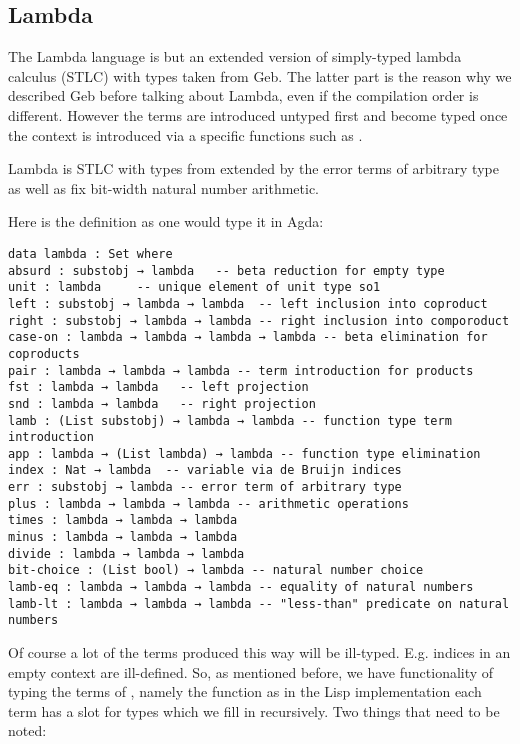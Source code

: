 \subsection{Lambda}

The Lambda language is but an extended version of simply-typed lambda calculus (STLC) with types taken from Geb. The latter part is the reason why we described Geb before talking about Lambda, even if the compilation order is different. However the terms are introduced untyped first and become typed once the context is introduced via a specific functions such as .
\begin{definition}
    Lambda is STLC with types from \gebobj extended by the error terms \lamerr of arbitrary type as well as fix bit-width natural number arithmetic.
\end{definition}

Here is the definition as one would type it in Agda:

\begin{verbatim}
data lambda : Set where
absurd : substobj → lambda   -- beta reduction for empty type
unit : lambda     -- unique element of unit type so1
left : substobj → lambda → lambda  -- left inclusion into coproduct
right : substobj → lambda → lambda -- right inclusion into comporoduct
case-on : lambda → lambda → lambda → lambda -- beta elimination for coproducts
pair : lambda → lambda → lambda -- term introduction for products
fst : lambda → lambda   -- left projection
snd : lambda → lambda   -- right projection
lamb : (List substobj) → lambda → lambda -- function type term introduction
app : lambda → (List lambda) → lambda -- function type elimination 
index : Nat → lambda  -- variable via de Bruijn indices
err : substobj → lambda -- error term of arbitrary type
plus : lambda → lambda → lambda -- arithmetic operations
times : lambda → lambda → lambda
minus : lambda → lambda → lambda
divide : lambda → lambda → lambda
bit-choice : (List bool) → lambda -- natural number choice
lamb-eq : lambda → lambda → lambda -- equality of natural numbers
lamb-lt : lambda → lambda → lambda -- "less-than" predicate on natural numbers
\end{verbatim}

Of course a lot of the terms produced this way will be ill-typed. E.g. indices in an empty context are ill-defined. So, as mentioned before, we have functionality of typing the terms of , namely the function  as in the Lisp implementation each term has a slot for types which we fill in recursively. Two things that need to be noted: 

